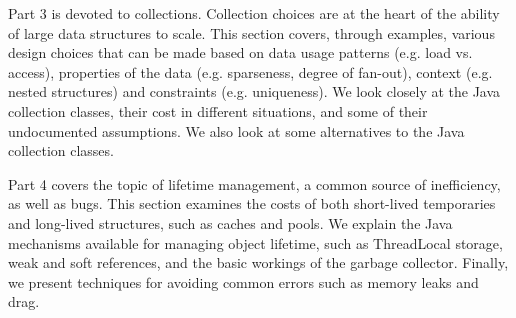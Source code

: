 Part 3 is devoted to collections. Collection choices are at the heart of the ability of large data structures to scale. This section covers, through examples, various design choices that can be made based on data usage patterns (e.g. load vs. access), properties of the data (e.g. sparseness, degree of fan-out), context (e.g. nested structures) and constraints (e.g. uniqueness).  We look closely at the Java collection classes, their cost in different situations, and some of their undocumented assumptions. We also look at some alternatives to the Java collection classes.
 
Part 4 covers the topic of lifetime management, a common source of inefficiency, as well as bugs. This section examines the costs of both short-lived temporaries and long-lived structures, such as caches and pools.  We explain the Java mechanisms available for managing object lifetime, such as ThreadLocal storage, weak and soft references, and the basic workings of the garbage collector. Finally, we present techniques for avoiding common errors such as memory leaks and drag. %

